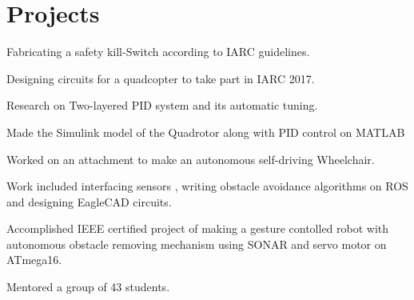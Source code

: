 \documentclass[letterpaper]{deedy-resume} %
\begin{document}
\begin{minipage}[t]{0.66\textwidth} %


\section{Projects}


\vspace{\topsep} %
\begin{tightitemize}
\item Fabricating a safety kill-Switch according to IARC guidelines.
\item Designing circuits for a quadcopter to take part in IARC 2017.
\item Research on Two-layered PID system and its automatic tuning.
\item Made the Simulink model of the Quadrotor along with PID control on MATLAB
\end{tightitemize}

\sectionspace %



\begin{tightitemize}
\item Worked on an attachment to make an autonomous self-driving Wheelchair.
\item Work included interfacing sensors , writing obstacle avoidance algorithms on ROS and designing EagleCAD circuits.
\end{tightitemize}

\sectionspace %



\begin{tightitemize}
\item Accomplished IEEE certified project of making a gesture contolled robot with autonomous obstacle removing mechanism using SONAR and servo motor on ATmega16.
\item Mentored a group of 43 students.
\end{tightitemize}


\end{minipage}
\end{document}
